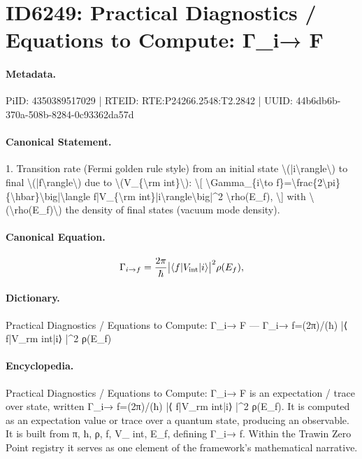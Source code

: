 \section*{ID6249: Practical Diagnostics / Equations to Compute: Γ\_i→ F}
\paragraph{Metadata.}
PiID: 4350389517029 | RTEID: RTE:P24266.2548:T2.2842 | UUID: 44b6db6b-370a-508b-8284-0c93362da57d

\paragraph{Canonical Statement.}
1. Transition rate (Fermi golden rule style) from an initial state \textbackslash{}(|i\textbackslash{}rangle\textbackslash{}) to final \textbackslash{}(|f\textbackslash{}rangle\textbackslash{}) due to \textbackslash{}(V\_\{\textbackslash{}rm int\}\textbackslash{}): \textbackslash{}[ \textbackslash{}Gamma\_\{i\textbackslash{}to f\}=\textbackslash{}frac\{2\textbackslash{}pi\}\{\textbackslash{}hbar\}\textbackslash{}big|\textbackslash{}langle f|V\_\{\textbackslash{}rm int\}|i\textbackslash{}rangle\textbackslash{}big|\textasciicircum{}2 \textbackslash{}rho(E\_f), \textbackslash{}] with \textbackslash{}(\textbackslash{}rho(E\_f)\textbackslash{}) the density of final states (vacuum mode density).

\paragraph{Canonical Equation.}
\[
\Gamma_{i\to f}=\frac{2\pi}{\hbar}\big|\langle f|V_{\rm int}|i\rangle\big|^2 \rho(E_f),
\]

\paragraph{Dictionary.}
Practical Diagnostics / Equations to Compute: Γ\_i→ F — Γ\_i→ f=(2π)/(ħ) |⟨ f|V\_rm int|i⟩ |\textasciicircum{}2 ρ(E\_f)

\paragraph{Encyclopedia.}
Practical Diagnostics / Equations to Compute: Γ\_i→ F is an expectation / trace over state, written Γ\_i→ f=(2π)/(ħ) |⟨ f|V\_rm int|i⟩ |\textasciicircum{}2 ρ(E\_f). It is computed as an expectation value or trace over a quantum state, producing an observable. It is built from π, ħ, ρ, f, V\_ int, E\_f, defining Γ\_i→ f. Within the Trawin Zero Point registry it serves as one element of the framework's mathematical narrative.
